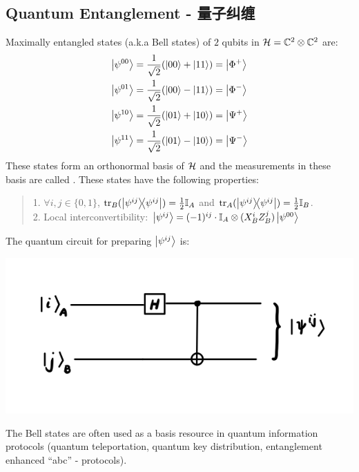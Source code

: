 \subsection{Quantum Entanglement - 量子纠缠}
Maximally entangled states (a.k.a Bell states) of $2$ qubits in $\mathcal{H} = \mathbb{C}^2 \otimes \mathbb{C}^2$ are:
\begin{align*}
    \ket{\psi^{00}} &= \frac{1}{\sqrt{2}}(\ket{00} + \ket{11}) = \ket{\Phi^{+}} \\
    \ket{\psi^{01}} &= \frac{1}{\sqrt{2}}(\ket{00} - \ket{11}) = \ket{\Phi^{-}} \\
    \ket{\psi^{10}} &= \frac{1}{\sqrt{2}}(\ket{01} + \ket{10}) = \ket{\Psi^{+}} \\
    \ket{\psi^{11}} &= \frac{1}{\sqrt{2}}(\ket{01} - \ket{10}) = \ket{\Psi^{-}} \\
\end{align*}
These states form an orthonormal basis of $\mathcal{H}$ and the measurements in these basis are called . These states have the following properties:
\begin{quote}
    1. $\forall i, j \in \{0, 1\}$, $\tr_B(\dyad{\psi^{ij}}) = \frac{1}{2}\id_A$ and $\tr_A(\dyad{\psi^{ij}}) = \frac{1}{2}\id_B$. \\
    2. Local interconvertibility: $\ket{\psi^{ij}} = (-1)^{ij} \cdot \mathbb{I}_A \otimes (X_B^iZ_B^j)\ket{\psi^{00}}$
\end{quote}
The quantum circuit for preparing $\ket{\psi^{ij}}$ is:
\begin{center}
    \includegraphics[scale = 1]{bell.png}
\end{center}
The Bell states are often used as a basis resource in quantum information protocols (quantum teleportation, quantum key distribution, entanglement enhanced ``abc'' - protocols).

